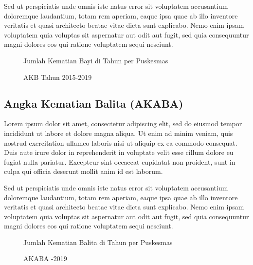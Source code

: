 Sed ut perspiciatis unde omnis iste natus error sit voluptatem accusantium doloremque laudantium, totam rem aperiam, eaque ipsa quae ab illo inventore veritatis et quasi architecto beatae vitae dicta sunt explicabo. Nemo enim ipsam voluptatem quia voluptas sit aspernatur aut odit aut fugit, sed quia consequuntur magni dolores eos qui ratione voluptatem sequi nesciunt.

\begin{figure}[H]
    \centering{}
    \caption{Jumlah Kematian Bayi di \namaKabupaten Tahun \tP per Puskesmas}
    \label{fig:Jumlah-Kematian-Bayi}
\end{figure}

\begin{figure}[H]
    \centering{}
    \caption{AKB \namaKabupaten Tahun 2015-2019}
    \label{fig:AKB-2015-2019}
\end{figure}


\subsection{Angka Kematian Balita (AKABA)}
Lorem ipsum dolor sit amet, consectetur adipiscing elit, sed do eiusmod tempor incididunt ut labore et dolore magna aliqua. Ut enim ad minim veniam, quis nostrud exercitation ullamco laboris nisi ut aliquip ex ea commodo consequat. Duis aute irure dolor in reprehenderit in voluptate velit esse cillum dolore eu fugiat nulla pariatur. Excepteur sint occaecat cupidatat non proident, sunt in culpa qui officia deserunt mollit anim id est laborum.

Sed ut perspiciatis unde omnis iste natus error sit voluptatem accusantium doloremque laudantium, totam rem aperiam, eaque ipsa quae ab illo inventore veritatis et quasi architecto beatae vitae dicta sunt explicabo. Nemo enim ipsam voluptatem quia voluptas sit aspernatur aut odit aut fugit, sed quia consequuntur magni dolores eos qui ratione voluptatem sequi nesciunt.

\begin{figure}[H]
    \centering{}
    \caption{Jumlah Kematian Balita di \namaKabupaten Tahun \tP per Puskesmas}
    \label{fig:Jumlah-Kematian-Balita}
\end{figure}

\begin{figure}[H]
    \centering{}
    \caption{AKABA -2019}
    \label{fig:AKABA-2015-2019}
\end{figure}

